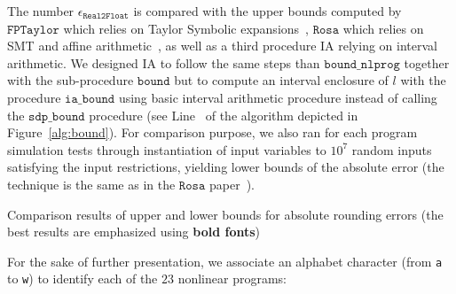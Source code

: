 \documentclass[preprint]{sigplanconf}
\newcommand{\code}[1]{\lstinline{#1}}
\newcommand{\nbenchs}{23}
\newcommand{\iabound}{\mathtt{ia\_bound}}
\newcommand{\sdpbound}{\mathtt{sdp\_bound}}
\newcommand{\bound}{\mathtt{bound}}
\newcommand{\boundnlprog}{\mathtt{bound\_nlprog}}
\newcommand{\realtofloat}{\mathtt{Real2Float}}
\newcommand{\rosa}{\mathtt{Rosa}}
\newcommand{\fptaylor}{\mathtt{FPTaylor}}
\theoremstyle{plain}
\begin{document}
The number $\epsilon_{\realtofloat}$ is compared with the upper bounds computed by $\fptaylor$ which relies on Taylor Symbolic expansions~\cite{fptaylor15}, $\rosa$ which relies on SMT and affine arithmetic~\cite{Darulova14Popl}, as well as a third procedure IA relying on interval arithmetic. We designed IA to follow the same steps than $\boundnlprog$ together with the sub-procedure $\bound$ but to compute an interval enclosure of $l$ with the procedure $\iabound$ using basic interval arithmetic procedure  instead of calling the $\sdpbound$ procedure (see Line~ of the algorithm depicted in Figure~\ref{alg:bound}). For comparison purpose, we also ran for each program simulation tests through instantiation of input variables to $10^7$ random inputs satisfying the input restrictions, yielding lower bounds of the absolute error (the technique is the same as in the $\rosa$ paper~\cite{Darulova14Popl}).
%
\begin{table*}[!ht]
\begin{center}
\caption{Comparison results of upper and lower bounds for absolute rounding errors (the best results are emphasized using \textbf{bold fonts})}

\label{table:error}
\end{center}
\end{table*}
%
For the sake of further presentation, we associate an alphabet character (from \code{a} to \code{w}) to identify each of the $\nbenchs$ nonlinear programs:
%
\end{document}
